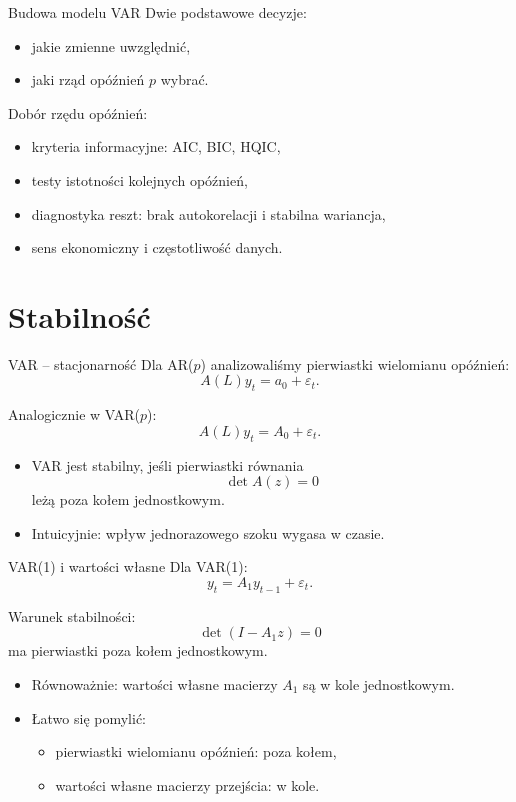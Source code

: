 \documentclass[11pt,aspectratio=169,xcolor=dvipsnames]{beamer}
\begin{document}
\begin{frame}{Budowa modelu VAR}
  Dwie podstawowe decyzje:
  \begin{itemize}
    \item jakie zmienne uwzględnić,
    \item jaki rząd opóźnień $p$ wybrać.
  \end{itemize}

  \vspace{0.5cm}
  Dobór rzędu opóźnień:
  \begin{itemize}
    \item kryteria informacyjne: AIC, BIC, HQIC,
    \item testy istotności kolejnych opóźnień,
    \item diagnostyka reszt: brak autokorelacji i stabilna wariancja,
    \item sens ekonomiczny i częstotliwość danych.
  \end{itemize}
\end{frame}

\section{Stabilność}

\begin{frame}{VAR -- stacjonarność}
  Dla AR($p$) analizowaliśmy pierwiastki wielomianu opóźnień:
  \[
    A(L)y_t = a_0 + \varepsilon_t.
  \]

  Analogicznie w VAR($p$):
  \[
    A(L)y_t = A_0 + \varepsilon_t.
  \]

  \begin{itemize}
    \item VAR jest stabilny, jeśli pierwiastki równania
      \[
        \det A(z)=0
      \]
      leżą poza kołem jednostkowym.
    \item Intuicyjnie: wpływ jednorazowego szoku wygasa w czasie.
  \end{itemize}
\end{frame}

\begin{frame}{VAR(1) i wartości własne}
  Dla VAR(1):
  \[
    y_t = A_1 y_{t-1} + \varepsilon_t.
  \]

  Warunek stabilności:
  \[
    \det(I - A_1z)=0
  \]
  ma pierwiastki poza kołem jednostkowym.

  \begin{itemize}
    \item Równoważnie: wartości własne macierzy $A_1$ są w kole jednostkowym.
    \item Łatwo się pomylić:
      \begin{itemize}
        \item pierwiastki wielomianu opóźnień: poza kołem,
        \item wartości własne macierzy przejścia: w kole.
      \end{itemize}
  \end{itemize}
\end{frame}
\end{document}
